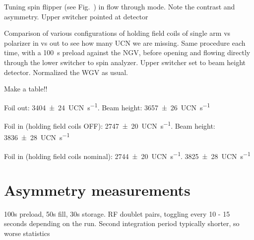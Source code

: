 Tuning spin flipper (see Fig.~) in flow through mode. Note the contrast and asymmetry. Upper switcher pointed at detector

Comparison of various configurations of holding field coils of single arm vs polarizer in vs out to see how many UCN we are missing. Same procedure each time, with a \qty{100}{s} preload against the NGV, before opening and flowing directly through the lower switcher to spin analyzer. Upper switcher set to beam height detector. Normalized the WGV as usual.

Make a table!!

Foil out: \qty{3404(24)}{UCN\per s}. Beam height: \qty{3657(26)}{UCN\per s}

Foil in (holding field coils OFF): \qty{2747(20)}{UCN\per s}. Beam height: \qty{3836(28)}{UCN\per s}

Foil in (holding field coils nominal): \qty{2744(20)}{UCN\per s}. \qty{3825(28)}{UCN\per s}


\section{Asymmetry measurements}


100s preload, 50s fill, 30s storage. RF doublet pairs, toggling every 10 - 15 seconds depending on the run. Second integration period typically shorter, so worse statistics


